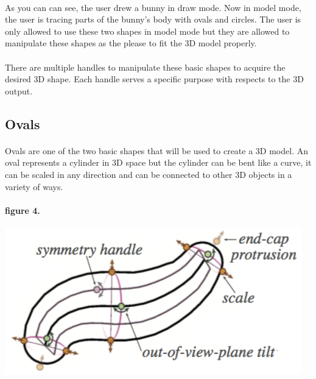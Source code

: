 \documentclass{report}
\begin{document}
\paragraph{} As you can can see, the user drew a bunny in draw mode. Now in model mode, the user is tracing parts of the bunny's body with ovals and circles. The user is only allowed to use these two shapes in model mode but they are allowed to manipulate these shapes as the please to fit the 3D model properly.

\paragraph{} There are multiple handles to manipulate these basic shapes to acquire the desired 3D shape. Each handle serves a specific purpose with respects to the 3D output. 

\subsection*{Ovals}

\paragraph{} Ovals are one of the two basic shapes that will be used to create a 3D model. An oval represents a cylinder in 3D space but the cylinder can be bent like a curve, it can be scaled in any direction and can be connected to other 3D objects in a variety of ways. 

\paragraph{figure 4.}
\begin{center}
\includegraphics[width=\textwidth/2]{oval_handles.png}
\end{center}
\end{document}
